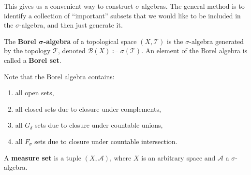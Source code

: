   This gives us a convenient way to construct $\sigma$-algebras. The general method is to identify a collection of ``important'' subsets that we would like to be included in the $\sigma$-algebra, and then just generate it.   

  \begin{definition}
    The \textbf{Borel $\boldsymbol{\sigma}$-algebra} of a topological space $(X, \mathscr{T})$ is the $\sigma$-algebra generated by the topology $\mathscr{T}$, denoted $\mathcal{B}(X) \coloneqq \sigma(\mathscr{T})$. An element of the Borel algebra is called a \textbf{Borel set}. 
  \end{definition}

  Note that the Borel algebra contains: 
  \begin{enumerate}
    \item all open sets, 
    \item all closed sets due to closure under complements, 
    \item all $G_\delta$ sets due to closure under countable unions, 
    \item all $F_\sigma$ sets due to closure under countable intersection. 
  \end{enumerate}

  \begin{definition}
    A \textbf{measure set} is a tuple $(X, \mathcal{A})$, where $X$ is an arbitrary space and $\mathcal{A}$ a $\sigma$-algebra. 
  \end{definition}

